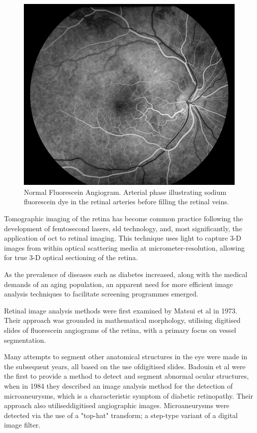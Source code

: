 \begin{figure}[H]
\centering
  \includegraphics{figures/fluore_angio}
\caption{Normal Fluorescein Angiogram. Arterial phase illustrating sodium fluorescein dye in the retinal arteries before filling the retinal veins.\cite{3_medicine.uiowa.edu_2015}}
\label{fig:fluore_angio_image}
\end{figure}

Tomographic imaging of the retina has become common practice following
the development of femtosecond \Gls{laser}s, \Gls{sld} technology, and,
most significantly, the application of \Gls{oct}
to retinal imaging.\cite{huang1991optical}  This technique uses light to capture
3-D images from within optical scattering media at micrometer-resolution,
allowing for true 3-D optical sectioning of the retina.\cite{van2007recent}

As the prevalence of diseases such as diabetes increased, along with
the medical demands of an aging population, an apparent need
for more efficient image analysis techniques to facilitate screening
programmes emerged.\cite{king1998global}

Retinal image analysis methods were first examined by Matsui et al
in 1973.\cite{matsui1973study}  Their approach was grounded in
mathematical morphology, utilising digitised slides of fluorescein
angiograms of the retina, with a primary focus on vessel segmentation.

Many attempts to segment other anatomical structures in the eye were
 made in the subsequent years, all based on the use ofdigitised slides.
Badouin et al were the first to provide a method to detect and segment
abnormal ocular structures, when in 1984 they described an image analysis
method for the detection of microaneurysms, which is a characteristic symptom
of diabetic retinopathy.\cite{baudoin1983automatic}  Their approach also
utiliseddigitised angiographic images.  Microaneurysms were detected
via the use of a "top-hat" transform; a step-type variant of a digital image filter.\cite{sonka1998image}  

